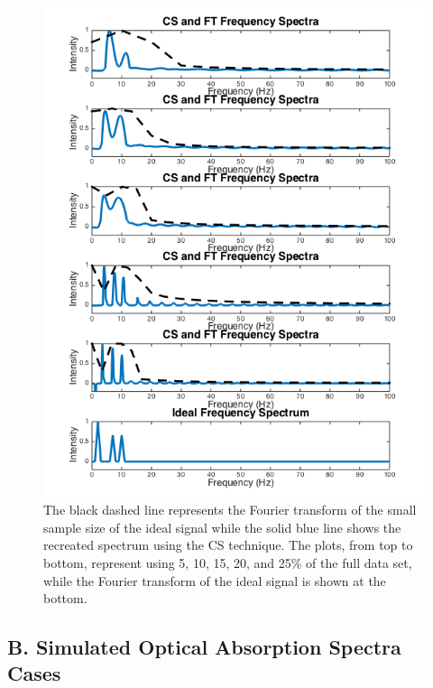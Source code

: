 \documentclass[11pt]{article}
\begin{document}
\begin{figure}[H]
\includegraphics[scale = 0.7]{samplingtimes_ideal_test.png}
\caption{The black dashed line represents the Fourier transform of the small sample size of the ideal signal while the solid blue line shows the recreated spectrum using the CS technique. The plots, from top to bottom, represent using 5, 10, 15, 20, and 25\% of the full data set, while the Fourier transform of the ideal signal is shown at the bottom.}
\label{fig:idealsamplerates}
\end{figure}
\pagebreak


\subsection*{B.	Simulated Optical Absorption Spectra Cases}
\end{document}
